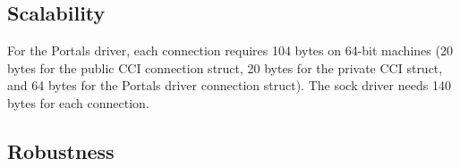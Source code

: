 \subsection{Scalability}

For the Portals driver, each connection requires 104 bytes on 64-bit machines
(20 bytes for the public CCI connection struct, 20 bytes for the private CCI
struct, and 64 bytes for the Portals driver connection struct).  The sock driver
needs 140 bytes for each connection.

\subsection{Robustness}

